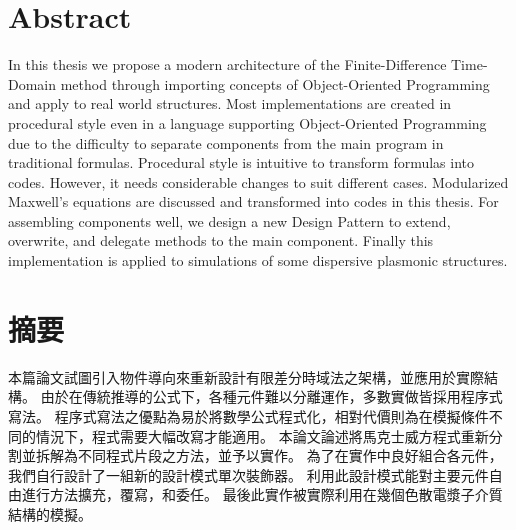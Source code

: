 \cleardoublepage
\chapter{Abstract}
In this thesis we propose a modern architecture of the Finite-Difference Time-Domain method through importing concepts
of Object-Oriented Programming and apply to real world structures. Most implementations are created in procedural style
even in a language supporting Object-Oriented Programming due to the difficulty to separate components from the main
program in traditional formulas. Procedural style is intuitive to transform formulas into codes. However, it needs
considerable changes to suit different cases. Modularized Maxwell's equations are discussed and transformed into codes in
this thesis. For assembling components well, we design a new Design Pattern to extend, overwrite, and delegate methods to
the main component. Finally this implementation is applied to simulations of some dispersive plasmonic structures.

\cleardoublepage
\chapter{\kai 摘要}
{
\kai
本篇論文試圖引入物件導向來重新設計有限差分時域法之架構，並應用於實際結構。
由於在傳統推導的公式下，各種元件難以分離運作，多數實做皆採用程序式寫法。
程序式寫法之優點為易於將數學公式程式化，相對代價則為在模擬條件不同的情況下，程式需要大幅改寫才能適用。
本論文論述將馬克士威方程式重新分割並拆解為不同程式片段之方法，並予以實作。
為了在實作中良好組合各元件，我們自行設計了一組新的設計模式單次裝飾器。
利用此設計模式能對主要元件自由進行方法擴充，覆寫，和委任。
最後此實作被實際利用在幾個色散電漿子介質結構的模擬。}
